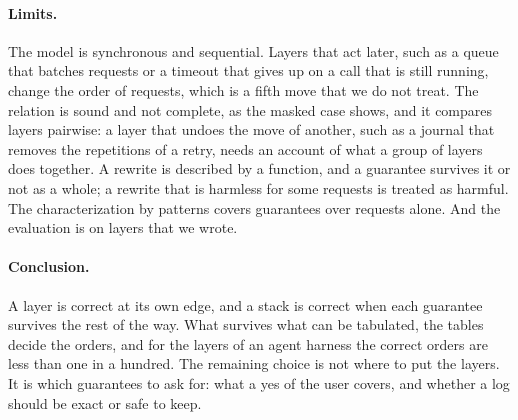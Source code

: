 \documentclass[acmsmall,nonacm,screen]{acmart}
\newcommand{\claim}[2]{#2}
\begin{document}
\paragraph{Limits.} The model is synchronous and sequential. Layers that act later, such as
a queue that batches requests or a timeout that gives up on a call that is still running,
change the order of requests, which is a fifth move that we do not treat. The relation is
sound and not complete, as the masked case shows, and it compares layers pairwise: a layer
that undoes the move of another, such as a journal that removes the repetitions of a retry,
needs an account of what a group of layers does together. A rewrite is described by a
function, and a guarantee survives it or not as a whole; a rewrite that is harmless for some
requests is treated as harmful. The characterization by patterns covers guarantees over
requests alone. And the evaluation is on layers that we wrote.

\paragraph{Conclusion.} A layer is correct at its own edge, and a stack is correct when each
guarantee survives the rest of the way. What survives what can be tabulated, the tables
decide the orders, and for the layers of an agent harness \claim{one-in-hundred}{the correct orders are less
than one in a hundred}. The remaining choice is not where to put the layers. It is which
guarantees to ask for: what a yes of the user covers, and whether a log should be exact or
safe to keep.



\end{document}
